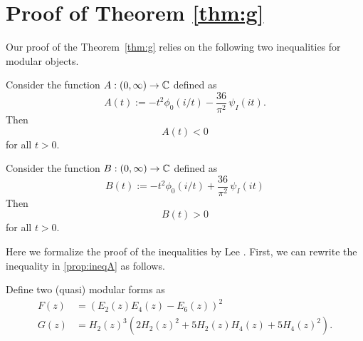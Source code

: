 \section{Proof of Theorem \ref{thm:g}}\label{sec: g}
Our proof of the Theorem~\ref{thm:g} relies on the following two inequalities for modular objects.
\begin{proposition}\label{prop:ineqA}
Consider the function $A:(0,\infty)\to\mathbb{C}$ defined as
\begin{equation}\label{eqn:defA}
A(t):=-t^2\phi_0(i/t)-\frac{36}{\pi^2}\,\psi_I(it).
\end{equation}
Then
\begin{equation}\label{eqn:ineqA}
  A(t) < 0
\end{equation}
for all $t > 0$.
\end{proposition}

\begin{proposition}\label{prop:ineqB}
Consider the function $B:(0,\infty)\to\mathbb{C}$ defined as
\begin{equation}\label{eqn:defB}
  B(t) := -t^2\phi_0(i/t)+\frac{36}{\pi^2}\,\psi_I(it)
\end{equation}
Then
\begin{equation}\label{eqn:ineqB}
  B(t) > 0
\end{equation}
for all $t > 0$.
\end{proposition}

Here we formalize the proof of the inequalities by Lee \cite{Lee}.
First, we can rewrite the inequality in \ref{prop:ineqA} as follows.

\begin{definition}
Define two (quasi) modular forms as
\begin{align}
  F(z) &= (E_2(z) E_4(z) - E_6(z))^2 \label{eqn:defF} \\
  G(z) &= H_2(z)^{3} (2 H_{2}(z)^{2} + 5 H_{2}(z) H_{4}(z) + 5 H_{4}(z)^{2}). \label{eqn:defG}
\end{align}
\end{definition}

